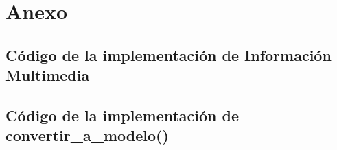 \documentclass[11pt]{article}
\begin{document}
  \appendix

\section{Anexo}

  \subsection{Código de la implementación de Información Multimedia}
      \label{sec:anexo-im}

      

      \clearpage

  \subsection{Código de la implementación de convertir\_a\_modelo()}
      \label{sec:anexo-convertir-a-modelo}
\end{document}
